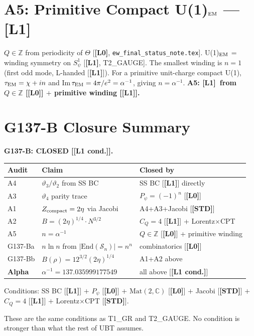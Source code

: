 \documentclass[12pt,a4paper]{article}
\theoremstyle{remark}\newtheorem{remark}[theorem]{Remark}
\newcommand{\Lz}{\textbf{[L0]}}
\newcommand{\Lo}{\textbf{[L1]}}
\newcommand{\Lc}{\textbf{[L1 cond.]}}
\newcommand{\STD}{\textbf{[STD]}}
\begin{document}
\section{A5: Primitive Compact U(1)$_{\rm EM}$ — \Lo}

$Q\in\mathbb Z$ from periodicity of $\Theta$ [\Lz,
\texttt{ew\_final\_status\_note.tex}].
U(1)$_{\rm EM}$ = winding symmetry on $S^1_\psi$ [\Lo, T2\_GAUGE].
The smallest winding is $n=1$ (first odd mode, L-handed [\Lo]).
For a primitive unit-charge compact U(1), $\tau_{\rm EM}=\chi+in$ and
Im$\,\tau_{\rm EM}=4\pi/e^2=\alpha^{-1}$, giving $n=\alpha^{-1}$.
\textbf{A5: \Lo\ from $Q\in\mathbb Z$ [\Lz] $+$ primitive winding [\Lo].}

\section{G137-B Closure Summary}

\begin{resultbox}
\textbf{G137-B: CLOSED [\Lc].}

\begin{center}
\renewcommand{\arraystretch}{1.2}\footnotesize
\begin{tabular}{llp{5cm}}
\toprule
Audit & Claim & Closed by \\
\midrule
A4 & $\vartheta_3/\vartheta_2$ from SS BC & SS BC [\Lo] directly \\
A3 & $\vartheta_4$ parity trace & $P_\psi=(-1)^n$ [\Lz] \\
A1 & $Z_{\rm compact}=2\eta$ via Jacobi & A4+A3+Jacobi [\STD] \\
A2 & $B=(2\eta)^{1/4}\cdot N^{3/2}$ & $C_Q=4$ [\Lo] + Lorentz$\times$CPT \\
A5 & $n=\alpha^{-1}$ & $Q\in\mathbb Z$ [\Lz] + primitive winding \\
\midrule
G137-Ba & $n\ln n$ from $|\mathrm{End}(\mathcal S_n)|=n^n$ & combinatorics [\Lz] \\
G137-Bb & $B(\rho)=12^{3/2}(2\eta)^{1/4}$ & A1+A2 above \\
\midrule
\textbf{Alpha} & $\alpha^{-1}=137.035999177549$ & all above [\Lc] \\
\bottomrule
\end{tabular}
\end{center}

\medskip
Conditions: SS BC [\Lo] $+$ $P_\psi$ [\Lz] $+$ $\mathrm{Mat}(2,\mathbb C)$ 
[\Lz] $+$ Jacobi [\STD] $+$ $C_Q=4$ [\Lo] $+$ Lorentz$\times$CPT [\STD].

These are the same conditions as T1\_GR and T2\_GAUGE.
No condition is stronger than what the rest of UBT assumes.
\end{resultbox}
\end{document}
